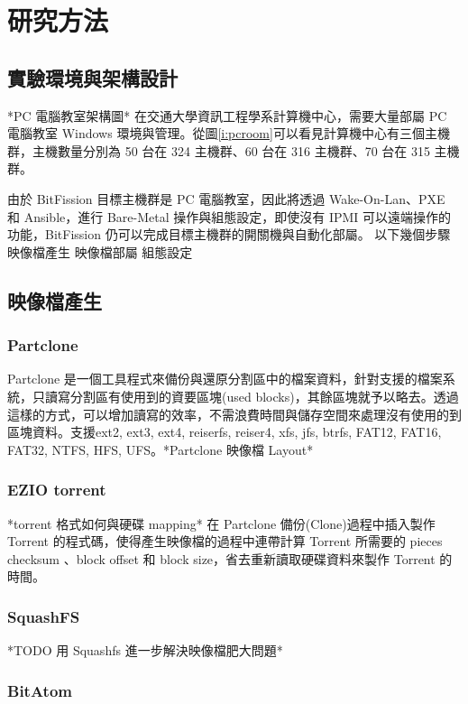 \chapter{研究方法}
\section{實驗環境與架構設計}



*PC 電腦教室架構圖*
在交通大學資訊工程學系計算機中心，需要大量部屬 PC 電腦教室 Windows 環境與管理。從圖\ref{i:pcroom}可以看見計算機中心有三個主機群，主機數量分別為 50 台在 324 主機群、60 台在 316 主機群、70 台在 315 主機群。

由於 BitFission 目標主機群是 PC 電腦教室，因此將透過 Wake-On-Lan、PXE 和 Ansible，進行 Bare-Metal 操作與組態設定，即使沒有 IPMI 可以遠端操作的功能，BitFission 仍可以完成目標主機群的開關機與自動化部屬。
以下幾個步驟 映像檔產生 映像檔部屬 組態設定

\section{映像檔產生}
\subsection{Partclone}
Partclone 是一個工具程式來備份與還原分割區中的檔案資料，針對支援的檔案系統，只讀寫分割區有使用到的資要區塊(used blocks)，其餘區塊就予以略去。透過這樣的方式，可以增加讀寫的效率，不需浪費時間與儲存空間來處理沒有使用的到區塊資料。支援ext2, ext3, ext4, reiserfs, reiser4, xfs, jfs, btrfs, FAT12, FAT16, FAT32, NTFS, HFS, UFS。*Partclone 映像檔 Layout*


\subsection{EZIO torrent}
*torrent 格式如何與硬碟 mapping*
在 Partclone 備份(Clone)過程中插入製作 Torrent 的程式碼，使得產生映像檔的過程中連帶計算 Torrent 所需要的 pieces checksum 、block offset 和 block size，省去重新讀取硬碟資料來製作 Torrent 的時間。

\subsection{SquashFS}
*TODO 用 Squashfs 進一步解決映像檔肥大問題*

\subsection{BitAtom}



